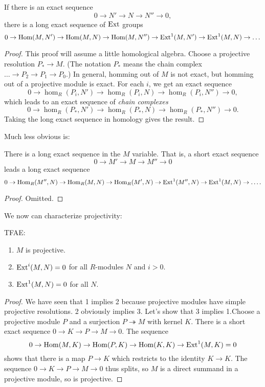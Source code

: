 \begin{proposition}
If there is an exact sequence
\[ 0 \to N' \to N \to N'' \to 0,  \]
there is a long exact sequence of $\mathrm{Ext}$ groups
\[ 0 \to \operatorname{Hom}(M,N') \to \operatorname{Hom}(M,N) \to \operatorname{Hom}(M,N'') \to
\mathrm{Ext}^1(M,N') \to
\mathrm{Ext}^1(M,N) \to \dots  \]
\end{proposition}
\begin{proof}
This proof will assume a little homological algebra. Choose a
projective
resolution $P_* \to M$. (The notation $P_*$ means the chain
complex $\dots \to
P_2 \to P_1 \to P_0$.) In general, homming out of $M$ is not
exact, but homming
out of a projective module is exact. For each $i$, we get an
exact sequence
\[ 0 \to \hom_R(P_i, N') \to \hom_R(P_i, N) \to \hom_R(P_i,
N'')\to 0, \]
which leads to an exact sequence of \emph{chain complexes}
\[ 0 \to \hom_R(P_*,N') \to \hom_R(P_*,N) \to \hom_R(P_*,N'')
\to 0 . \]
Taking the long exact sequence in homology gives the result.
\end{proof}


Much less obvious is:

\begin{proposition}
There is a long exact sequence in the $M$ variable. That is, a
short exact
sequence
\[ 0 \to M' \to M \to M'' \to 0  \]
leads a long exact sequence
\[ 0 \to \operatorname{Hom}_R(M'', N) \to \operatorname{Hom}_R(M,N) \to \operatorname{Hom}_R(M', N) \to
\mathrm{Ext}^1(M'', N)
\to \mathrm{Ext}^1(M, N) \to \dots.  \]
\end{proposition}
\begin{proof}
Omitted.
\end{proof}

We now can characterize projectivity:
\begin{corollary}
TFAE:
\begin{enumerate}
\item $M$ is projective.
\item $\mathrm{Ext}^i(M,N) = 0$ for all $R$-modules $N$ and $i>0$.
\item  $\mathrm{Ext}^1(M,N)=0$ for all $N$.
\end{enumerate}
\end{corollary}
\begin{proof}
We have seen that 1 implies 2 because projective modules have
simple projective
resolutions. 2 obviously implies 3. Let's show that 3 implies
1.Choose a
projective module $P$ and a surjection $P \twoheadrightarrow M$
with kernel
$K$. There is a short exact sequence $0 \to K \to P \to M \to
0$. The sequence
\[ 0 \to \operatorname{Hom}(M,K) \to \operatorname{Hom}(P,K) \to \operatorname{Hom}(K,K) \to
\mathrm{Ext}^1(M,K)=0\]
shows that there is a map $P \to K$ which restricts to the
identity $K \to K$.
The sequence $0 \to K \to P \to M \to 0$ thus splits, so $M$ is
a direct
summand in a projective module, so is projective.
\end{proof}

